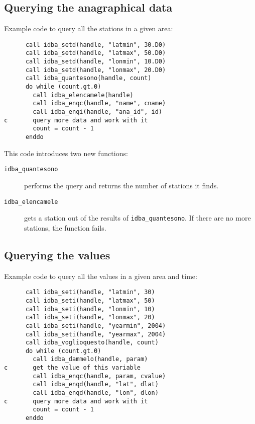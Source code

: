 \documentclass[final,12pt,a4paper,twoside]{book}
\begin{document}
\subsection {Querying the anagraphical data}

Example code to query all the stations in a given area:
\label{fun-idba_quantesono}
\label{fun-idba_elencamele}

\begin{verbatim}
      call idba_setd(handle, "latmin", 30.D0)
      call idba_setd(handle, "latmax", 50.D0)
      call idba_setd(handle, "lonmin", 10.D0)
      call idba_setd(handle, "lonmax", 20.D0)
      call idba_quantesono(handle, count)
      do while (count.gt.0)
        call idba_elencamele(handle)
        call idba_enqc(handle, "name", cname)
        call idba_enqi(handle, "ana_id", id)
c       query more data and work with it
        count = count - 1
      enddo
\end{verbatim}

This code introduces two new functions:

\begin{description}
\item[{\tt idba\_quantesono}]
  performs the query and returns the number of stations it finds.

\item[{\tt idba\_elencamele}]
  gets a station out of the results of {\tt idba\_quantesono}.  If there are no
  more stations, the function fails.
\end{description}

\subsection {Querying the values}

Example code to query all the values in a given area and time:
\label{fun-idba_voglioquesto}
\label{fun-idba_dammelo}

\begin{verbatim}
      call idba_seti(handle, "latmin", 30)
      call idba_seti(handle, "latmax", 50)
      call idba_seti(handle, "lonmin", 10)
      call idba_seti(handle, "lonmax", 20)
      call idba_seti(handle, "yearmin", 2004)
      call idba_seti(handle, "yearmax", 2004)
      call idba_voglioquesto(handle, count)
      do while (count.gt.0)
        call idba_dammelo(handle, param)
c       get the value of this variable
        call idba_enqc(handle, param, cvalue)
        call idba_enqd(handle, "lat", dlat)
        call idba_enqd(handle, "lon", dlon)
c       query more data and work with it
        count = count - 1
      enddo
\end{verbatim}
   
\end{document}
